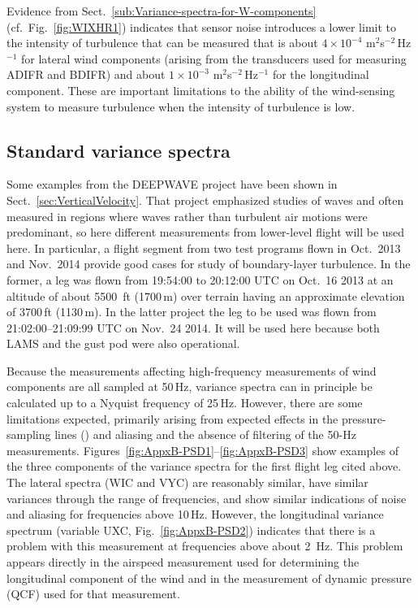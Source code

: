 \documentclass[12pt,twoside,english]{article}\usepackage[]{graphicx}\usepackage[]{color}
\let\OrgIndex\index
\renewcommand*{\index}[1]{\OrgIndex{#1}}
\begin{document}
Evidence from Sect.~\ref{sub:Variance-spectra-for-W-components} (cf.~Fig.~\ref{fig:WIXHR1}) indicates that sensor noise introduces a lower limit to the intensity of turbulence that can be measured that is about $4\times10^{-4}$ m$^{2}$s$^{-2}$\,Hz$^{-1}$ for lateral wind components (arising from the transducers used for measuring ADIFR and BDIFR) and about $1\times10^{-3}$ m$^{2}$s$^{-2}$\,Hz$^{-1}$ for the longitudinal component. These are important limitations to the ability of the wind-sensing system to measure turbulence when the intensity of turbulence is low. 


\subsection{Standard variance spectra\label{sub:var-spec}}

Some examples from the DEEPWAVE project have been shown in Sect.~\ref{sec:VerticalVelocity}. That project emphasized studies of waves and often measured in regions where waves rather than turbulent air motions were predominant, so here different measurements from lower-level flight will be used here. In particular, a flight segment from two test programs flown in Oct.~2013 and Nov.~2014 provide good cases for study of boundary-layer turbulence. In the former, a leg was flown from 19:54:00 to 20:12:00 UTC on Oct.~16 2013 at an altitude of about 5500~ft (1700\,m) over terrain having an approximate elevation of 3700\,ft (1130\,m). In the latter project the leg to be used was flown from 21:02:00--21:09:99 UTC on Nov.~24 2014. It will be used here because both LAMS and the gust pod were also operational. 



Because the measurements affecting high-frequency measurements of wind components are all sampled at 50\,Hz, variance spectra can in principle be calculated up to a Nyquist frequency of 25\,Hz. However, there are some limitations expected, primarily arising from expected effects in the pressure-sampling lines (\citet{Iberall1950}) and aliasing and the absence of filtering of the 50-Hz measurements. Figures\ \ref{fig:AppxB-PSD1}--\ref{fig:AppxB-PSD3} show examples of the three components of the variance spectra for the first flight leg cited above. The lateral spectra (WIC and VYC) are reasonably similar, have similar variances through the range of frequencies, and show similar indications of noise and aliasing for frequencies above 10\,Hz. However, the longitudinal variance spectrum (variable UXC, Fig.~\ref{fig:AppxB-PSD2}) indicates that there is a problem with this measurement at frequencies above about 2~Hz. This problem appears directly in the airspeed measurement used for determining the longitudinal component of the wind and in the measurement of dynamic pressure (QCF) used for that measurement. 
\end{document}
